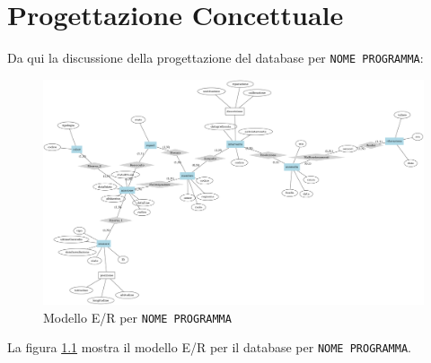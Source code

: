 \chapter{Progettazione Concettuale}
Da qui la discussione della progettazione del database
per \texttt{NOME PROGRAMMA}:
\begin{figure}
  \includegraphics[width=\linewidth]{images/er.png}
  \caption{Modello E/R per \texttt{NOME PROGRAMMA}}
  \label{fig:er}
\end{figure}

La figura \ref{fig:er} mostra il modello E/R per il
database per \texttt{NOME PROGRAMMA}.

